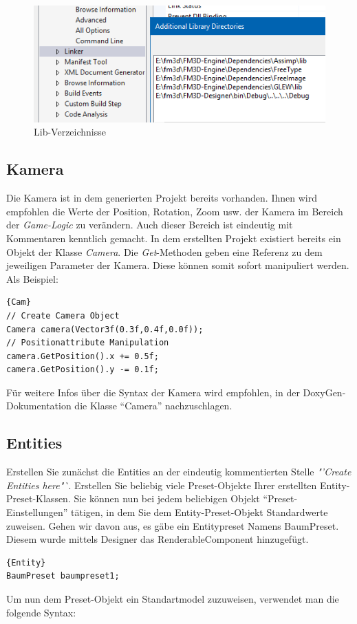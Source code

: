 \begin{figure}
	\begin{center}
		\includegraphics[width=\textwidth]{04verwendung/Engine/lib.png}
		\caption{Lib-Verzeichnisse}\label{liblib}
	\end{center}
\end{figure}

\subsection{Kamera}
Die Kamera ist in dem generierten Projekt bereits vorhanden. Ihnen wird empfohlen die Werte der Position, Rotation, Zoom usw. der Kamera im Bereich der \textit{Game-Logic} zu verändern. Auch dieser Bereich ist eindeutig mit Kommentaren kenntlich gemacht.
In dem erstellten Projekt existiert bereits ein Objekt der Klasse \textit{Camera}. Die \textit{Get}-Methoden geben eine Referenz zu dem jeweiligen Parameter der Kamera. Diese können somit sofort manipuliert werden. Als Beispiel:
\begin{lstlisting}{Cam}
// Create Camera Object
Camera camera(Vector3f(0.3f,0.4f,0.0f));
// Positionattribute Manipulation
camera.GetPosition().x += 0.5f;
camera.GetPosition().y -= 0.1f;
\end{lstlisting}
Für weitere Infos über die Syntax der Kamera wird empfohlen, in der DoxyGen-Dokumentation die Klasse "`Camera"' nachzuschlagen.

\subsection{Entities}
Erstellen Sie zunächst die Entities an der eindeutig kommentierten Stelle \textit{"'Create Entities here"`}. Erstellen Sie beliebig viele Preset-Objekte Ihrer erstellten Entity-Preset-Klassen. Sie können nun bei jedem beliebigen Objekt "`Preset-Einstellungen"' tätigen, in dem Sie dem Entity-Preset-Objekt Standardwerte zuweisen. Gehen wir davon aus, es gäbe ein Entitypreset Namens BaumPreset. Diesem wurde mittels Designer das RenderableComponent hinzugefügt.
\begin{lstlisting}{Entity}
BaumPreset baumpreset1;
\end{lstlisting}
Um nun dem Preset-Objekt ein Standartmodel zuzuweisen, verwendet man die folgende Syntax:

